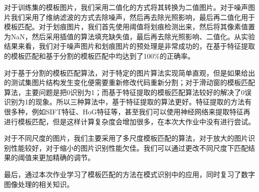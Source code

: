 \documentclass[cn]{elegantbook}
\begin{document}
对于训练集的模板图片，我们采用二值化的方式将其转换为二值图片。对于噪声图片我们采用了维纳滤波的方式去除噪声，然后再去除光照影响，最后再二值化用于模板匹配。对于划痕图片，我们首先使用阈值将划痕检测出来，然后将其像素值置为NaN，然后采用插值的算法填充缺失值，最后再去除光照影响、二值化。从实验结果来看，我们对于噪声图片和划痕图片的预处理是非常成功的，在基于特征提取的模板匹配和基于分割的模板匹配中均达到了100\%的正确率。

对于基于分割的模板匹配算法，对于特定的图片算法实现简单直观，但是如果给出的测试集图片结构发生变化便需要重新修改代码重新分割；对于滑动窗的模板匹配算法，主要问题是把0识别为1；而基于特征提取的模板匹配算法较好的解决了0误识别为1的现象。所以三种算法中，基于特征提取的算法更好。特征提取的方法有很多种，例如SIFT特征、HoG特征等，甚至我们可以使用神经网络来提取特征再进行模板匹配，但是这样计算复杂度会增加很多，在本次大作业中没有进行尝试。

对于不同尺度的图片，我们主要采用了多尺度模板匹配的算法，对于放大的图片识别性能较好，对于缩小的图片识别性能欠佳。我们可以通过更改不同尺度下匹配结果的阈值来更加精确的调节。

最后，通过本次作业学习了模板匹配的方法在模式识别中的应用，同时复习了数字图像处理的相关知识。
\end{document}
